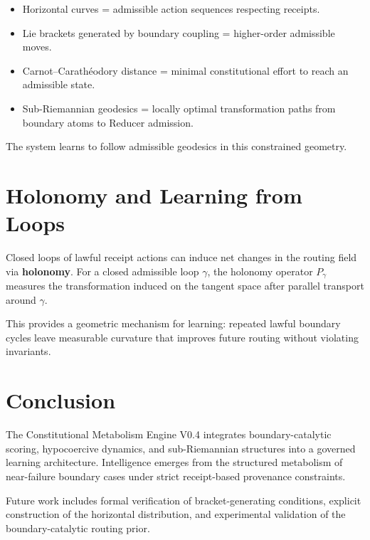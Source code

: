 \documentclass[11pt,a4paper]{article}
\begin{document}
\begin{itemize}
    \item Horizontal curves = admissible action sequences respecting receipts.
    \item Lie brackets generated by boundary coupling = higher-order admissible moves.
    \item Carnot--Carathéodory distance = minimal constitutional effort to reach an admissible state.
    \item Sub-Riemannian geodesics = locally optimal transformation paths from boundary atoms to Reducer admission.
\end{itemize}

The system learns to follow admissible geodesics in this constrained geometry.

\section{Holonomy and Learning from Loops}

Closed loops of lawful receipt actions can induce net changes in the routing field via \textbf{holonomy}. For a closed admissible loop $\gamma$, the holonomy operator $P_\gamma$ measures the transformation induced on the tangent space after parallel transport around $\gamma$.

This provides a geometric mechanism for learning: repeated lawful boundary cycles leave measurable curvature that improves future routing without violating invariants.

\section{Conclusion}

The Constitutional Metabolism Engine V0.4 integrates boundary-catalytic scoring, hypocoercive dynamics, and sub-Riemannian structures into a governed learning architecture. Intelligence emerges from the structured metabolism of near-failure boundary cases under strict receipt-based provenance constraints.

Future work includes formal verification of bracket-generating conditions, explicit construction of the horizontal distribution, and experimental validation of the boundary-catalytic routing prior.
\end{document}
